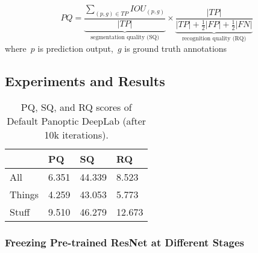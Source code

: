 \documentclass[10pt,twocolumn,letterpaper]{article}
\begin{document}
\[
  PQ = 
    \underbrace{\frac{\sum\nolimits_{(p, g) \in TP} IOU_{(p, g)}}{|TP|}}_\text{segmentation quality (SQ)} \times 
    \underbrace{\frac{|TP|}{|TP| + \frac{1}{2}|FP| + \frac{1}{2}|FN|}}_\text{recognition quality (RQ)}
\]
where~$p$ is prediction output,~$g$ is ground truth annotations

\subsection{Experiments and Results}




\begin{table}[h!]
\begin{center}
\begin{tabular}{ || m{3em} | m{1cm}| m{1cm} | m{1cm} || } 
  \hline
   & PQ & SQ & RQ \\ 
  \hline
  All & 6.351 & 44.339 & 8.523 \\ 
  \hline
  Things & 4.259 & 43.053 & 5.773 \\ 
  \hline
  Stuff & 9.510 & 46.279 & 12.673 \\ 
  \hline
\end{tabular}
\caption{PQ, SQ, and RQ scores of Default Panoptic DeepLab (after 10k iterations).}
\label{tab:deeplab_default}
\end{center}
\end{table}


\subsubsection{Freezing Pre-trained ResNet at Different Stages}
\end{document}
